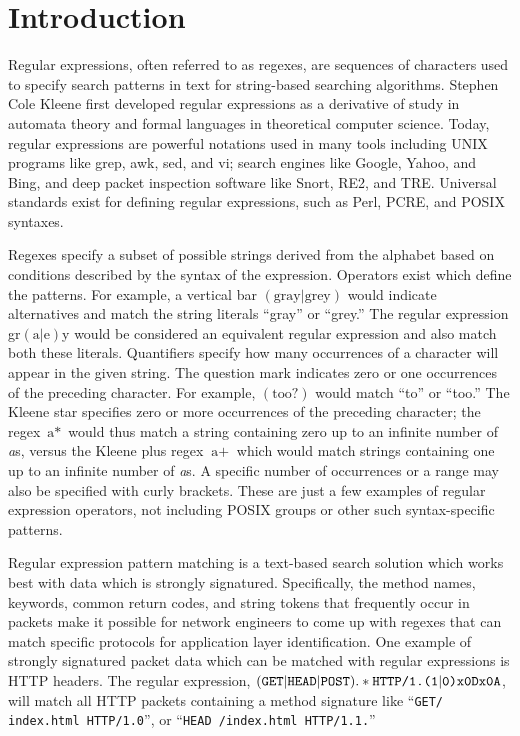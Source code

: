 \section{Introduction}
Regular expressions, often referred to as regexes, are sequences of characters used to specify search patterns in text for string-based searching algorithms. Stephen Cole Kleene first developed regular expressions as a derivative of study in automata theory and formal languages in theoretical computer science. Today, regular expressions are powerful notations used in many tools including UNIX programs like grep, awk, sed, and vi; search engines like Google, Yahoo, and Bing, and deep packet inspection software like Snort, RE2, and TRE. Universal standards exist for defining regular expressions, such as Perl, PCRE, and POSIX syntaxes.

Regexes specify a subset of possible strings derived from the alphabet based on conditions described by the syntax of the expression. Operators exist which define the patterns. For example, a vertical bar $(\text{gray}\vert\text{grey})$ would indicate alternatives and match the string literals ``gray'' or ``grey.'' The regular expression gr$(\text{a}\vert\text{e})$y would be considered an equivalent regular expression and also match both these literals. Quantifiers specify how many occurrences of a character will appear in the given string. The question mark indicates zero or one occurrences of the preceding character. For example, $(\text{too}?)$ would match ``to'' or ``too.'' The Kleene star specifies zero or more occurrences of the preceding character; the regex $\text{a}*$ would thus match a string containing zero up to an infinite number of \textit{a}s, versus the Kleene plus regex $\text{a}+$ which would match strings containing one up to an infinite number of \textit{a}s. A specific number of occurrences or a range may also be specified with curly brackets. These are just a few examples of regular expression operators, not including POSIX groups or other such syntax-specific patterns.

Regular expression pattern matching is a text-based search solution which works best with data which is strongly signatured. Specifically, the method names, keywords, common return codes, and string tokens that frequently occur in packets make it possible for network engineers to come up with regexes that can match specific protocols for application layer identification. One example of strongly signatured packet data which can be matched with regular expressions is HTTP headers. The regular expression, $(\texttt{GET}|\texttt{HEAD}|\texttt{POST}).*\texttt{HTTP/1.(1}|\texttt{0)}\texttt{\\x0D\\x0A}$, will match all HTTP packets containing a method signature like ``\texttt{GET/ index.html HTTP/1.0}'', or ``\texttt{HEAD /index.html HTTP/1.1.}''


